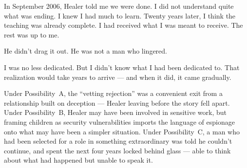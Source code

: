 
In September 2006, Healer told me we were done. I did not understand quite what was ending. I knew I had much to learn. Twenty years later, I think the teaching was already complete. I had received what I was meant to receive. The rest was up to me.

He didn't drag it out. He was not a man who lingered.

I was no less dedicated. But I didn't know what I had been dedicated to. That realization would take years to arrive --- and when it did, it came gradually.

Under Possibility~A, the ``vetting rejection'' was a convenient exit from a relationship built on deception --- Healer leaving before the story fell apart. Under Possibility~B, Healer may have been involved in sensitive work, but framing children as security vulnerabilities imports the language of espionage onto what may have been a simpler situation. Under Possibility~C, a man who had been selected for a role in something extraordinary was told he couldn't continue, and spent the next four years locked behind glass --- able to think about what had happened but unable to speak it.

\chapterreturn
